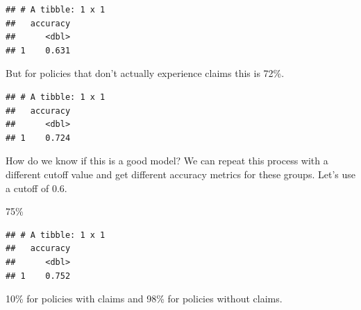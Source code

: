 \documentclass[openany]{book}
\newenvironment{Shaded}{\begin{snugshade}}{\end{snugshade}}
\newcommand{\DataTypeTok}[1]{\textcolor[rgb]{0.13,0.29,0.53}{#1}}
\newcommand{\DecValTok}[1]{\textcolor[rgb]{0.00,0.00,0.81}{#1}}
\newcommand{\KeywordTok}[1]{\textcolor[rgb]{0.13,0.29,0.53}{\textbf{#1}}}
\newcommand{\NormalTok}[1]{#1}
\newcommand{\OperatorTok}[1]{\textcolor[rgb]{0.81,0.36,0.00}{\textbf{#1}}}
\newcommand{\StringTok}[1]{\textcolor[rgb]{0.31,0.60,0.02}{#1}}
\begin{document}
\begin{verbatim}
## # A tibble: 1 x 1
##   accuracy
##      <dbl>
## 1    0.631
\end{verbatim}

But for policies that don't actually experience claims this is 72\%.

\begin{Shaded}
\end{Shaded}

\begin{verbatim}
## # A tibble: 1 x 1
##   accuracy
##      <dbl>
## 1    0.724
\end{verbatim}

How do we know if this is a good model? We can repeat this process with a different cutoff value and get different accuracy metrics for these groups. Let's use a cutoff of 0.6.

75\%

\begin{Shaded}
\end{Shaded}

\begin{verbatim}
## # A tibble: 1 x 1
##   accuracy
##      <dbl>
## 1    0.752
\end{verbatim}

10\% for policies with claims and 98\% for policies without claims.

\begin{Shaded}
\end{Shaded}
\end{document}
